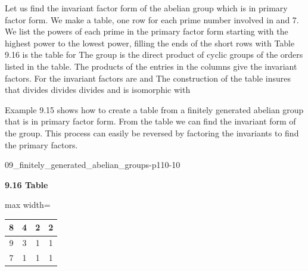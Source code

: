 \documentclass[11pt,oneside]{article}
\begin{document}
\begin{BookBody}
 Let us find the invariant factor form of the abelian group   which is in primary factor form. We make a table, one row for each prime number involved in  and 7. We list the powers of each prime in the primary factor form starting with the highest power to the lowest power, filling the ends of the short rows with  Table 9.16 is the table for  The group  is the direct product of cyclic groups of the orders listed in the table. The products of the entries in the columns give the invariant factors. For  the invariant factors are   and  The construction of the table insures that  divides  divides  divides  and  is isomorphic with  \BookEnd{\blacktriangle}

\noindent Example 9.15 shows how to create a table from a finitely generated abelian group that is in primary factor form. From the table we can find the invariant form of the group. This process can easily be reversed by factoring the invariants to find the primary factors.

\begin{BookFloat}{09_finitely_generated_abelian_groups-p110-10}
\begin{center}\small\textbf{9.16 Table}\end{center}
\begin{center}\begin{adjustbox}{max width=\linewidth}
\renewcommand{\arraystretch}{1.2}\setlength{\tabcolsep}{5pt}
\begin{tabular}{|c|c|c|c|}
\hline
8 & 4 & 2 & 2\\\hline
9 & 3 & 1 & 1\\\hline
7 & 1 & 1 & 1\\\hline
\end{tabular}
\end{adjustbox}\end{center}
\end{BookFloat}


\end{BookBody}
\end{document}
